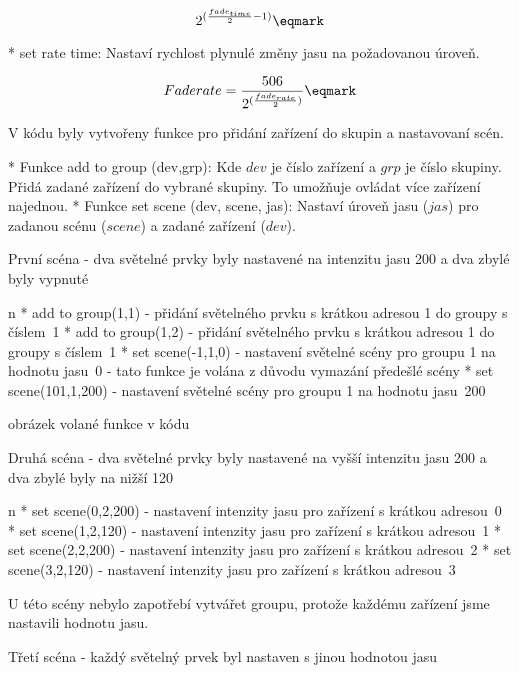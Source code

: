     $$ 2^{({fade_{time} \over 2} -1)} \eqmark $$

    * {\sbf set rate time:} Nastaví rychlost plynulé změny jasu na požadovanou úroveň.

    $$ Fade rate = {506 \over {2^{({fade_{rate} \over 2})}}} \eqmark $$

\enditems


\medskip\medskip
\noindent
V kódu byly vytvořeny funkce pro přidání zařízení do skupin a nastavovaní scén.

\begitems
    * Funkce {\sbf  add to group (dev,grp):} Kde $dev$ je číslo zařízení a $grp$ je číslo skupiny.
        Přidá zadané zařízení do vybrané skupiny.
        To umožňuje ovládat více zařízení najednou.
    * Funkce {\sbf set scene (dev, scene, jas):}
        Nastaví úroveň jasu ($jas$) pro zadanou scénu ($scene$) a zadané zařízení
        ($dev$).
\enditems


\medskip\noindent
{\sbf První scéna} - dva světelné prvky byly nastavené na intenzitu jasu 200 a dva zbylé byly vypnuté

\begitems \style n
* add to group(1,1) - přidání světelného prvku s krátkou adresou 1 do groupy s číslem~1
* add to group(1,2) - přidání světelného prvku s krátkou adresou 1 do groupy s číslem~1
* set scene(-1,1,0) - nastavení světelné scény pro groupu 1 na hodnotu jasu~0 - tato funkce je volána z důvodu vymazání předešlé scény
* set scene(101,1,200) - nastavení světelné scény pro groupu 1 na hodnotu jasu~200
\enditems

obrázek volané funkce v kódu

\noindent
{\sbf Druhá scéna} - dva světelné prvky byly nastavené na vyšší intenzitu jasu 200 a dva zbylé byly na nižší 120

\begitems \style n
* set scene(0,2,200) - nastavení intenzity jasu pro zařízení s krátkou adresou~0
* set scene(1,2,120) - nastavení intenzity jasu pro zařízení s krátkou adresou~1
* set scene(2,2,200) - nastavení intenzity jasu pro zařízení s krátkou adresou~2
* set scene(3,2,120) - nastavení intenzity jasu pro zařízení s krátkou adresou~3
\enditems

\noindent U této scény nebylo zapotřebí vytvářet groupu, protože každému zařízení jsme nastavili hodnotu jasu.

\noindent
{\sbf Třetí scéna} - každý světelný prvek byl nastaven s jinou hodnotou jasu

